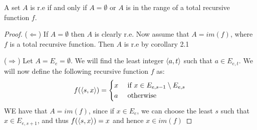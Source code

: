 \documentclass[../main.tex]{subfiles}
\begin{document}
\begin{thm}
	A set $A$ is r.e if and only if $A=\emptyset$ or $A$ is in the range of
	a total recursive function $f$. 
\end{thm}
\begin{proof}
	($\Leftarrow$) If $A=\emptyset$ then $A$ is clearly r.e. Now
	assume that $A=im(f)$, where $f$ is a total recursive function. Then
	$A$ is r.e by corollary 2.1

	($\Rightarrow$)
	Let $A=E_e=\emptyset$. We will find the least integer $\langle a,t\rangle$ such
	that $a\in E_{e,t}$. We will now define the following recursive
	function $f$ as:
	\[f(\langle s,x\rangle)=\begin{cases}
		x &\ \text{if}\ x\in E_{e,s-1}\setminus E_{e,s}\\
		a &\ \text{otherwise}
	\end{cases}\]
	WE have that $A= im (f)$, since if $x\in E_e$, we can choose the least
	$s$ such that $x\in E_{e,s+1}$, and thus $f(\langle s,x\rangle)=x$ and hence
	$x\in im(f)$
\end{proof}
\end{document}
